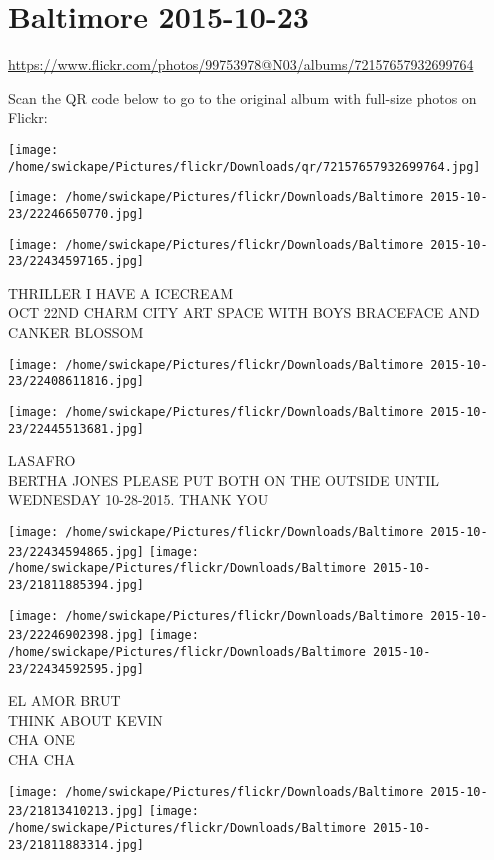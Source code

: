 \documentclass[10pt,letterpaper]{article}
\title{}
\author{}
\date{}
\begin{document}
\section*{Baltimore 2015-10-23}

\url{https://www.flickr.com/photos/99753978@N03/albums/72157657932699764}

Scan the QR code below to go to the original album with full-size photos on Flickr:

\texttt{[image: /home/swickape/Pictures/flickr/Downloads/qr/72157657932699764.jpg]}
\pagebreak

\texttt{[image: /home/swickape/Pictures/flickr/Downloads/Baltimore 2015-10-23/22246650770.jpg]}

\vspace{0.25in}
\texttt{[image: /home/swickape/Pictures/flickr/Downloads/Baltimore 2015-10-23/22434597165.jpg]}

THRILLER I HAVE A ICECREAM\\
OCT 22ND CHARM CITY ART SPACE WITH BOYS BRACEFACE AND CANKER BLOSSOM
\pagebreak

\texttt{[image: /home/swickape/Pictures/flickr/Downloads/Baltimore 2015-10-23/22408611816.jpg]}

\vspace{0.25in}
\texttt{[image: /home/swickape/Pictures/flickr/Downloads/Baltimore 2015-10-23/22445513681.jpg]}

LASAFRO\\
BERTHA JONES PLEASE PUT BOTH ON THE OUTSIDE UNTIL WEDNESDAY 10{-}28{-}2015.  THANK YOU
\pagebreak

\texttt{[image: /home/swickape/Pictures/flickr/Downloads/Baltimore 2015-10-23/22434594865.jpg]}
\texttt{[image: /home/swickape/Pictures/flickr/Downloads/Baltimore 2015-10-23/21811885394.jpg]}

\texttt{[image: /home/swickape/Pictures/flickr/Downloads/Baltimore 2015-10-23/22246902398.jpg]}
\texttt{[image: /home/swickape/Pictures/flickr/Downloads/Baltimore 2015-10-23/22434592595.jpg]}

EL AMOR BRUT\\
THINK ABOUT KEVIN\\
CHA ONE\\
CHA CHA
\pagebreak

\texttt{[image: /home/swickape/Pictures/flickr/Downloads/Baltimore 2015-10-23/21813410213.jpg]}
\texttt{[image: /home/swickape/Pictures/flickr/Downloads/Baltimore 2015-10-23/21811883314.jpg]}
\end{document}
